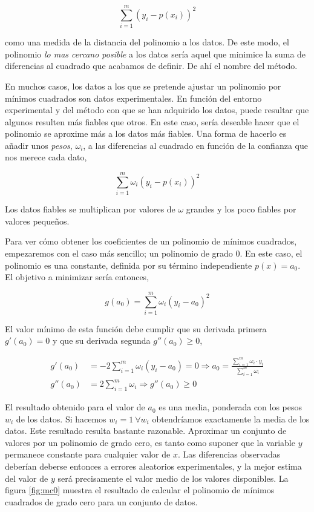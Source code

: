 \begin{equation*}
\sum_{i=1}^m \left(y_i-p(x_i)\right)^2
\end{equation*}

como una medida de la distancia del polinomio a los datos.  De este modo,  el polinomio \emph{lo mas cercano posible}  a los datos sería aquel que minimice la suma de diferencias al cuadrado que acabamos de definir. De ahí el nombre del método.

En muchos casos, los datos a los que se pretende ajustar un polinomio por mínimos cuadrados son datos experimentales. En función del entorno experimental y del método con que se han adquirido los datos, puede resultar que algunos resulten más fiables que otros. En este caso, sería deseable hacer que el polinomio se aproxime más a los datos más fiables. Una forma de hacerlo es añadir unos \emph{pesos}, $\omega_i$, a las diferencias al  cuadrado en función de la confianza que nos merece cada dato,

\begin{equation*}
\sum_{i=1}^m \omega_i \left(y_i-p(x_i)\right)^2
\end{equation*}

Los datos fiables se multiplican por valores de $\omega$ grandes y los poco fiables por valores pequeños.

Para ver cómo obtener los coeficientes de un polinomio de mínimos cuadrados, empezaremos con el caso más sencillo; un polinomio de grado $0$. En este caso, el polinomio es una constante, definida por su término independiente $p(x)=a_0$. El objetivo a minimizar sería entonces,

\begin{equation*}
g(a_0)=\sum_{i=1}^m \omega_i \left(y_i-a_0\right)^2
\end{equation*}

El valor mínimo de esta función debe cumplir que su derivada primera $g'(a_0)=0$ y que su derivada segunda  $g''(a_0)\geq 0$,

\begin{align*}
g'(a_0)&=-2\sum_{i=1}^m \omega_i \left(y_i-a_0\right)=0 \Rightarrow a_0=\frac{\sum_{i=1}^m \omega_i\cdot y_i}{ \sum_{i=1}^m \omega_i}\\
g''(a_0)&=2\sum_{i=1}^m \omega_i \Rightarrow  g''(a_0) \geq 0
\end{align*}

El resultado obtenido para el valor de $a_0$ es una media, ponderada con los pesos $w_i$ de los datos. Si hacemos $w_i=1 \ \forall w_i$ obtendríamos exactamente la media de los datos. Este resultado resulta bastante razonable. Aproximar un conjunto de valores por un polinomio de grado cero, es tanto como suponer que la variable $y$ permanece constante para cualquier valor de $x$. Las diferencias observadas deberían deberse entonces a errores aleatorios experimentales, y la mejor estima del valor de $y$ será precisamente el valor medio de los valores disponibles. La figura \ref{fig:mc0} muestra el resultado de  calcular el polinomio de mínimos cuadrados de grado cero para un conjunto de datos.

